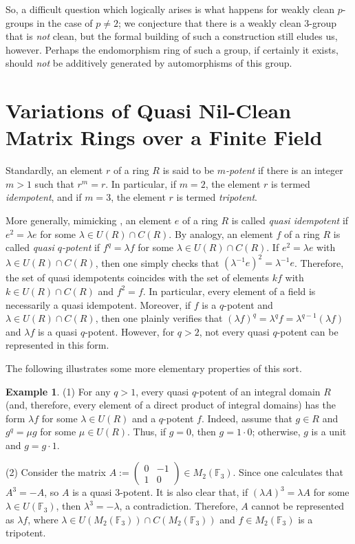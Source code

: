 \documentclass{amsart}
\theoremstyle{definition}
\newtheorem{example}[theorem]{Example}
\theoremstyle{remark}
\numberwithin{equation}{section}
\begin{document}
So, a difficult question which logically arises is what happens for weakly clean $p$-groups in the case of $p\not=2$; we conjecture that there is a weakly clean $3$-group that is {\it not} clean, but the formal building of such a construction still eludes us, however. Perhaps the endomorphism ring of such a group, if certainly it exists, should {\it not} be additively generated by automorphisms of this group.

\section{Variations of Quasi Nil-Clean Matrix Rings over a Finite Field}

Standardly, an element $r$ of a ring $R$ is said to be {\it $m$-potent} if there is an integer $m>1$ such that $r^m=r$. In particular, if $m=2$, the element $r$ is termed {\it idempotent}, and if $m=3$, the element $r$ is termed {\it tripotent}.

More generally, mimicking \cite{quasi-clean}, an element $e$ of a ring $R$ is called {\it quasi idempotent} if $e^{2} = \lambda e$ for some ${\lambda \in U(R) \cap C(R)}$. By analogy, an element $f$ of a ring $R$ is called {\it quasi $q$-potent} if $f^{q} = \lambda f$ for some ${\lambda \in U(R) \cap C(R)}$. If $e^{2} = \lambda e$ with ${\lambda \in U(R) \cap C(R)}$, then one simply checks that $(\lambda^{-1} e)^{2} = \lambda^{-1}e$. Therefore, the set of quasi idempotents coincides with the set of elements $kf$ with ${k \in U(R) \cap C(R)}$ and $f^{2} = f$. In particular, every element of a field is necessarily a quasi idempotent. Moreover, if $f$ is a $q$-potent and ${\lambda \in U(R) \cap C(R)}$, then one plainly verifies that $(\lambda f)^{q} = \lambda^{q} f = \lambda^{q-1} (\lambda f)$ and $\lambda f$ is a quasi $q$-potent. However, for $q > 2$, not every quasi $q$-potent can be represented in this form.

\medskip

The following illustrates some more elementary properties of this sort.

\begin{example}
(1) For any $q > 1$, every quasi $q$-potent of an integral domain $R$ (and, therefore, every element of a direct product of integral domains) has the form $\lambda f$ for some $\lambda \in U(R)$ and a $q$-potent $f$. Indeed, assume that $g \in R$ and $g^{q} = \mu g$ for some $\mu \in U(R)$. Thus, if $g = 0$, then $g = 1 \cdot 0$; otherwise, $g$ is a unit and $g = g \cdot 1$.

(2) Consider the matrix
$A :=
\begin{pmatrix}
0 & -1
\\
1 &  0
\end{pmatrix}
\in M_{2}(\mathbb{F}_{3})$. Since one calculates that $A^{3} = -A$, so $A$ is a quasi $3$-potent. It is also clear that, if $(\lambda A)^3 = \lambda A$ for some $\lambda \in U(\mathbb{F}_{3})$, then $\lambda^{3} = -\lambda$, a contradiction. Therefore, $A$ cannot be represented as $\lambda f$, where ${\lambda \in U(M_{2}(\mathbb{F}_{3})) \cap C(M_{2}(\mathbb{F}_{3}))}$ and $f \in M_{2}(\mathbb{F}_{3})$ is a tripotent.
\end{example}
\end{document}
